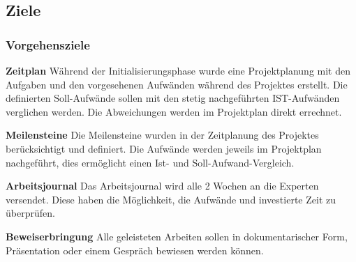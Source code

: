 \subsection{Ziele}
\subsubsection{Vorgehensziele}

\textbf{Zeitplan}
\newline
Während der Initialisierungsphase wurde eine Projektplanung mit den Aufgaben und den vorgesehenen Aufwänden während des Projektes erstellt. Die definierten Soll-Aufwände sollen mit den stetig nachgeführten IST-Aufwänden verglichen werden. Die Abweichungen werden im Projektplan direkt errechnet.

\textbf{Meilensteine}
\newline
Die Meilensteine wurden in der Zeitplanung des Projektes berücksichtigt und definiert. Die Aufwände werden jeweils im Projektplan nachgeführt, dies ermöglicht einen Ist- und Soll-Aufwand-Vergleich.

\textbf{Arbeitsjournal}
\newline
Das Arbeitsjournal wird alle 2 Wochen an die Experten versendet. Diese haben die Möglichkeit, die Aufwände und investierte Zeit zu überprüfen.

\textbf{Beweiserbringung}
\newline
Alle geleisteten Arbeiten sollen in dokumentarischer Form, Präsentation oder einem Gespräch bewiesen werden können.
